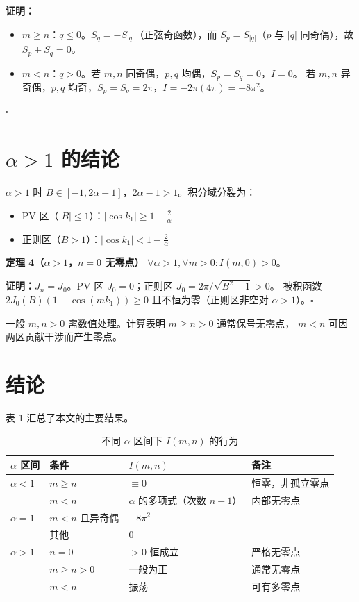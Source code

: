 \documentclass[12pt,a4paper]{ctexart}
\begin{document}
\textbf{证明：}
\begin{itemize}
\item $m\geq n$：$q\leq0$。$S_q=-S_{|q|}$（正弦奇函数），而 $S_p=S_{|q|}$（$p$ 与 $|q|$ 同奇偶），故 $S_p+S_q=0$。
\item $m<n$：$q>0$。若 $m,n$ 同奇偶，$p,q$ 均偶，$S_p=S_q=0$，$I=0$。
  若 $m,n$ 异奇偶，$p,q$ 均奇，$S_p=S_q=2\pi$，$I=-2\pi(4\pi)=-8\pi^2$。
\end{itemize}
$\square$

\section{$\alpha>1$ 的结论}

$\alpha>1$ 时 $B\in[-1,2\alpha-1]$，$2\alpha-1>1$。积分域分裂为：
\begin{itemize}
\item PV 区（$|B|\leq1$）：$|\cos k_1|\geq 1-\frac{2}{\alpha}$
\item 正则区（$B>1$）：$|\cos k_1|<1-\frac{2}{\alpha}$
\end{itemize}

\textbf{定理 4（$\alpha>1$，$n=0$ 无零点）}
$\forall\alpha>1,\forall m>0: I(m,0)>0$。

\textbf{证明：}$J_n=J_0$。PV 区 $J_0=0$；正则区 $J_0=2\pi/\sqrt{B^2-1}>0$。
被积函数 $2J_0(B)(1-\cos(mk_1))\geq0$ 且不恒为零（正则区非空对 $\alpha>1$）。$\square$

一般 $m,n>0$ 需数值处理。计算表明 $m\geq n>0$ 通常保号无零点，
$m<n$ 可因两区贡献干涉而产生零点。

\section{结论}

表 1 汇总了本文的主要结果。

\begin{table}[htbp]
\centering
\caption{不同 $\alpha$ 区间下 $I(m,n)$ 的行为}
\label{tab:summary}
\begin{tabular}{p{2.2cm}lll}
\toprule
$\alpha$ 区间 & 条件 & $I(m,n)$ & 备注 \\
\midrule
$\alpha<1$ & $m\geq n$ & $\equiv0$ & 恒零，非孤立零点 \\
 & $m<n$ & $\alpha$ 的多项式（次数 $n-1$）& 内部无零点 \\
\midrule
$\alpha=1$ & $m<n$ 且异奇偶 & $-8\pi^2$ & \\
 & 其他 & $0$ & \\
\midrule
$\alpha>1$ & $n=0$ & $>0$ 恒成立 & 严格无零点 \\
 & $m\geq n>0$ & 一般为正 & 通常无零点 \\
 & $m<n$ & 振荡 & 可有多零点 \\
\bottomrule
\end{tabular}
\end{table}
\end{document}
